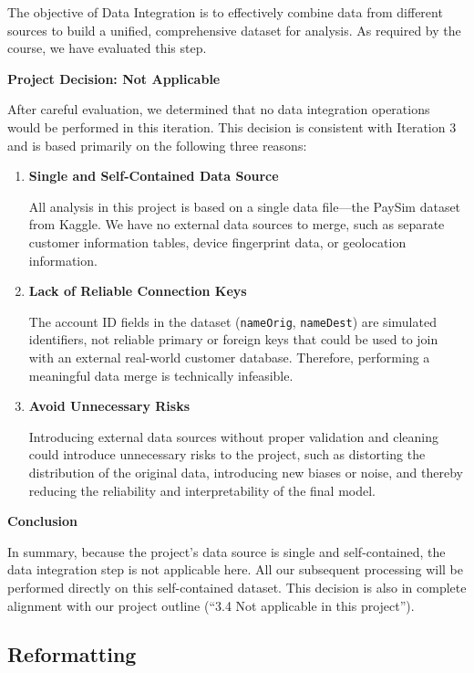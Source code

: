 \documentclass[sigplan,screen]{acmart}
\begin{document}
The objective of Data Integration is to effectively combine data from different sources to build a unified, comprehensive dataset for analysis. As required by the course, we have evaluated this step.

\textbf{Project Decision: Not Applicable}

After careful evaluation, we determined that no data integration operations would be performed in this iteration. This decision is consistent with Iteration 3 and is based primarily on the following three reasons:

\begin{enumerate}
\item \textbf{Single and Self-Contained Data Source}

All analysis in this project is based on a single data file---the PaySim dataset from Kaggle. We have no external data sources to merge, such as separate customer information tables, device fingerprint data, or geolocation information.

\item \textbf{Lack of Reliable Connection Keys}

The account ID fields in the dataset (\texttt{nameOrig}, \texttt{nameDest}) are simulated identifiers, not reliable primary or foreign keys that could be used to join with an external real-world customer database. Therefore, performing a meaningful data merge is technically infeasible.

\item \textbf{Avoid Unnecessary Risks}

Introducing external data sources without proper validation and cleaning could introduce unnecessary risks to the project, such as distorting the distribution of the original data, introducing new biases or noise, and thereby reducing the reliability and interpretability of the final model.
\end{enumerate}

\textbf{Conclusion}

In summary, because the project's data source is single and self-contained, the data integration step is not applicable here. All our subsequent processing will be performed directly on this self-contained dataset. This decision is also in complete alignment with our project outline (``3.4 Not applicable in this project'').

\subsection{Reformatting}
\end{document}
